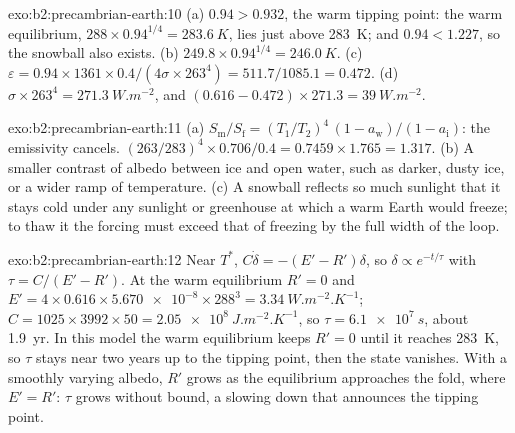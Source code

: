 \begin{solution}{exo:b2:precambrian-earth:10}
(a) $0.94 > 0.932$, the warm tipping point: the warm equilibrium, $288\times0.94^{1/4} =
\qty{283.6}{K}$, lies just above \qty{283}{K}; and $0.94 < 1.227$, so the snowball also exists.
(b) $249.8\times0.94^{1/4} = \qty{246.0}{K}$. (c) $\varepsilon = 0.94\times1361\times0.4/(4\sigma
\times263^4) = 511.7/1085.1 = 0.472$. (d) $\sigma\times263^4 = \qty{271.3}{W.m^{-2}}$, and $(0.616
- 0.472)\times271.3 = \qty{39}{W.m^{-2}}$.
\end{solution}

\begin{solution}{exo:b2:precambrian-earth:11}
(a) $S_{\text{m}}/S_{\text{f}} = (T_1/T_2)^4\,(1 - a_{\text{w}})/(1 - a_{\text{i}})$: the
emissivity cancels. $(263/283)^4\times0.706/0.4 = 0.7459\times1.765 = 1.317$. (b) A smaller
contrast of albedo between ice and open water, such as darker, dusty ice, or a wider ramp of
temperature. (c) A snowball reflects so much sunlight that it stays cold under any sunlight or
greenhouse at which a warm Earth would freeze; to thaw it the forcing must exceed that of
freezing by the full width of the loop.
\end{solution}

\begin{solution}{exo:b2:precambrian-earth:12}
Near $T^*$, $C\dot\delta = -(E' - R')\delta$, so $\delta \propto e^{-t/\tau}$ with $\tau =
C/(E' - R')$. At the warm equilibrium $R' = 0$ and $E' = 4\times0.616\times\num{5.670e-8}\times
288^3 = \qty{3.34}{W.m^{-2}.K^{-1}}$; $C = 1025\times3992\times50 = \qty{2.05e8}{J.m^{-2}.K^{-1}}$,
so $\tau = \qty{6.1e7}{s}$, about \qty{1.9}{yr}. In this model the warm equilibrium keeps $R' =
0$ until it reaches \qty{283}{K}, so $\tau$ stays near two years up to the tipping point, then
the state vanishes. With a smoothly varying albedo, $R'$ grows as the equilibrium approaches the
fold, where $E' = R'$: $\tau$ grows without bound, a slowing down that announces the tipping
point.
\end{solution}

